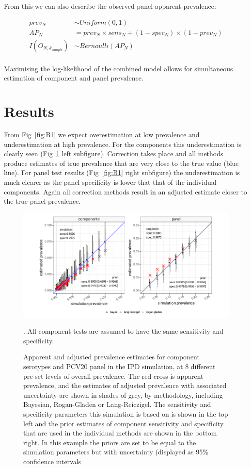 \documentclass[a4paper, 12pt, twoside]{article}
\let\Oldsection\section
\renewcommand{\section}{\FloatBarrier\Oldsection}
\begin{document}
From this we can also describe the observed panel apparent prevalence:

\begin{equation*}
\begin{aligned}
prev_N &\sim Uniform(0,1) \\
AP_N &= prev_N \times sens_N + (1-spec_N) \times (1-prev_N) \\
I(O_{N,k_{sample}}) &\sim Bernoulli(AP_N) \\
\end{aligned}
\end{equation*}

Maximising the log-likelihood of the combined model allows for simultaneous estimation of component and panel prevalence.

\section{Results}

From Fig~\ref{fig:B1} we expect overestimation at low prevalence and underestimation at high prevalence. For the components this underestimation is clearly seen (Fig~\ref{fig:B3} left subfigure). Correction takes place and all methods produce estimates of true prevalence that are very close to the true value (blue line). For panel test results (Fig~\ref{fig:B1} right subfigure) the underestimation is much clearer as the panel specificity is lower that that of the individual components. Again all correction methods result in an adjusted estimate closer to the true panel prevalence.

\begin{figure}[h!]
\centering
  \includegraphics{fig/simulation_result_sens_80_80}
  \caption{Apparent and adjusted prevalence estimates for component serotypes and PCV20 panel in the IPD simulation, at 8 different pre-set levels of overall prevalence. The red cross is apparent prevalence, and the estimates of adjusted prevalence with associated uncertainty are shown in shades of grey, by methodology, including Bayesian, Rogan-Gladen or Lang-Reiczigel. The sensitivity and specificity parameters this simulation is based on is shown in the top left and the prior estimates of component sensitivity and specificity that are used in the individual methods are shown in the bottom right. In this example the priors are set to be equal to the simulation parameters but with uncertainty (displayed as 95\% confidence intervals}. All component tests are assumed to have the same sensitivity and specificity.
\label{fig:B3}
\end{figure}
\end{document}
